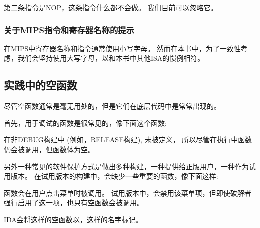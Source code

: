 第二条指令是\ac{NOP}，这条指令什么都不会做。
我们目前可以忽略它。

\subsubsection{关于MIPS指令和寄存器名称的提示}

在MIPS中寄存器名称和指令通常使用小写字母。
然而在本书中，为了一致性考虑，我们会坚持使用大写字母，以和本书中其他\ac{ISA}的惯例相符。

\subsection{实践中的空函数}

尽管空函数通常是毫无用处的，但是它们在底层代码中是常常出现的。

首先，用于调试的函数是很常见的，像下面这个函数:



在非DEBUG构建中 (例如，RELEASE构建), 未被定义，
所以尽管在执行中函数仍会被调用，但函数体为空。

另外一种常见的软件保护方式是做出多种构建，一种提供给正版用户，一种作为试用版本。
在试用版本的构建中，会缺少一些重要的函数，像下面这样:



 函数会在用户点击菜单时被调用。
试用版本中，会禁用该菜单项，但即使破解者强行启用了这一项，也只有空函数会被调用。

IDA会将这样的空函数以，这样的名字标记。

